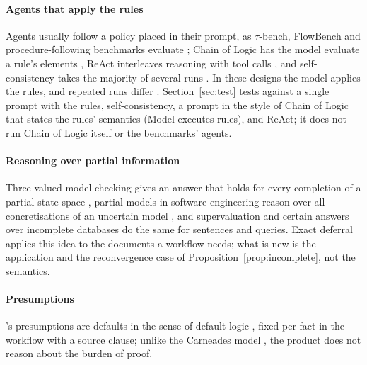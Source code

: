 \paragraph{Agents that apply the rules}
Agents usually follow a policy placed in their prompt, as $\tau$-bench, FlowBench and procedure-following benchmarks evaluate \cite{yao2025taubench,xiao2024flowbench,li2026sopbench}; Chain of Logic has the model evaluate a rule's elements \cite{servantez2024chain}, ReAct interleaves reasoning with tool calls \cite{yao2022react}, and self-consistency takes the majority of several runs \cite{wang2023selfconsistency}. In these designs the model applies the rules, and repeated runs differ \cite{atil2025nondeterminism,blairstanek2025unstable}. Section~\ref{sec:test} tests \casepath against a single prompt with the rules, self-consistency, a prompt in the style of Chain of Logic that states the rules' semantics (Model executes rules), and ReAct; it does not run Chain of Logic itself or the benchmarks' agents.

\paragraph{Reasoning over partial information}
Three-valued model checking gives an answer that holds for every completion of a partial state space \cite{bruns1999model}, partial models in software engineering reason over all concretisations of an uncertain model \cite{famelis2012partial}, and supervaluation \cite{vanfraassen1966singular} and certain answers over incomplete databases \cite{imielinski1984incomplete} do the same for sentences and queries. Exact deferral applies this idea to the documents a workflow needs; what is new is the application and the reconvergence case of Proposition~\ref{prop:incomplete}, not the semantics.

\paragraph{Presumptions}
\casepath's presumptions are defaults in the sense of default logic \cite{reiter1980logic}, fixed per fact in the workflow with a source clause; unlike the Carneades model \cite{gordon2007carneades}, the product does not reason about the burden of proof.

